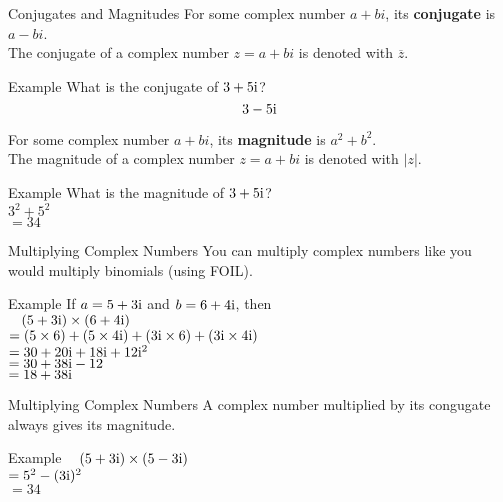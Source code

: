 \begin{namedframe}{Conjugates and Magnitudes}
	For some complex number $a + bi$, its \textbf{conjugate} is $a - bi$. \\
	The conjugate of a complex number $z = a + bi$ is denoted with $\overline{z}$.
	\begin{exampleblock}{Example}
		What is the conjugate of $3 + 5\mathrm{i}$?
		\pause
		\[3 - 5\mathrm{i}\]
	\end{exampleblock}

	\pause

	For some complex number $a + bi$, its \textbf{magnitude} is $a^2 + b^2$. \\
	The magnitude of a complex number $z = a + bi$ is denoted with $|z|$.
	\begin{exampleblock}{Example}
		What is the magnitude of $3 + 5\mathrm{i}$? \\
		\pause
		\phantom{X}$3^2 + 5^2$ \\
		$ = 34$
	\end{exampleblock}
\end{namedframe}

\begin{namedframe}{Multiplying Complex Numbers}
	You can multiply complex numbers like you would multiply binomials (using FOIL).
	\begin{exampleblock}{Example}
		If $a = 5 + 3\mathrm{i}$ and $b = 6 + 4\mathrm{i}$, then \\
		$\phantom{X}(5 + 3\mathrm{i})\times(6 + 4\mathrm{i})$ \\
		$= (5\times6) + (5\times4\mathrm{i}) + (3\mathrm{i}\times6) + (3\mathrm{i}\times4\mathrm{i})$ \\
		$= 30 + 20\mathrm{i} + 18\mathrm{i} + 12\mathrm{i}^2$ \\
		$= 30 + 38\mathrm{i} - 12$ \\
		$= 18 + 38\mathrm{i}$ \\
	\end{exampleblock}
\end{namedframe}

\begin{namedframe}{Multiplying Complex Numbers}
	A complex number multiplied by its congugate always gives its magnitude.
	\begin{exampleblock}{Example}
		$\phantom{X}(5 + 3\mathrm{i})\times(5 - 3\mathrm{i})$ \\
		$= 5^2 - (3\mathrm{i})^2$ \\
		$= 34$
	\end{exampleblock}
\end{namedframe}

